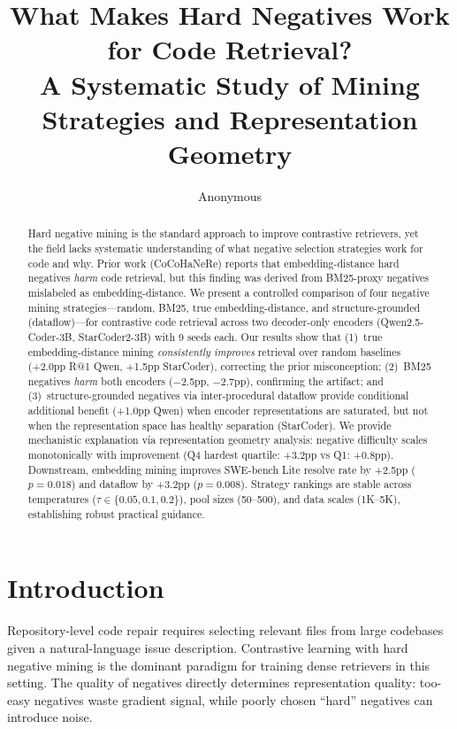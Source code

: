 \documentclass[11pt]{article}
\title{What Makes Hard Negatives Work for Code Retrieval?\\A Systematic Study of Mining Strategies and Representation Geometry}
\author{Anonymous}
\date{}
\begin{document}
\maketitle

\begin{abstract}
Hard negative mining is the standard approach to improve contrastive retrievers, yet the field lacks systematic understanding of what negative selection strategies work for code and why.
Prior work (CoCoHaNeRe) reports that embedding-distance hard negatives \emph{harm} code retrieval, but this finding was derived from BM25-proxy negatives mislabeled as embedding-distance.
We present a controlled comparison of four negative mining strategies---random, BM25, true embedding-distance, and structure-grounded (dataflow)---for contrastive code retrieval across two decoder-only encoders (Qwen2.5-Coder-3B, StarCoder2-3B) with 9 seeds each.
Our results show that (1)~true embedding-distance mining \emph{consistently improves} retrieval over random baselines (+2.0pp R@1 Qwen, +1.5pp StarCoder), correcting the prior misconception;
(2)~BM25 negatives \emph{harm} both encoders ($-$2.5pp, $-$2.7pp), confirming the artifact;
and (3)~structure-grounded negatives via inter-procedural dataflow provide conditional additional benefit (+1.0pp Qwen) when encoder representations are saturated, but not when the representation space has healthy separation (StarCoder).
We provide mechanistic explanation via representation geometry analysis: negative difficulty scales monotonically with improvement (Q4 hardest quartile: +3.2pp vs Q1: +0.8pp).
Downstream, embedding mining improves SWE-bench Lite resolve rate by +2.5pp ($p=0.018$) and dataflow by +3.2pp ($p=0.008$).
Strategy rankings are stable across temperatures ($\tau \in \{0.05, 0.1, 0.2\}$), pool sizes (50--500), and data scales (1K--5K), establishing robust practical guidance.
\end{abstract}

\section{Introduction}
\label{sec:intro}

Repository-level code repair requires selecting relevant files from large codebases given a natural-language issue description.
Contrastive learning with hard negative mining is the dominant paradigm for training dense retrievers in this setting.
The quality of negatives directly determines representation quality: too-easy negatives waste gradient signal, while poorly chosen ``hard'' negatives can introduce noise.
\end{document}
